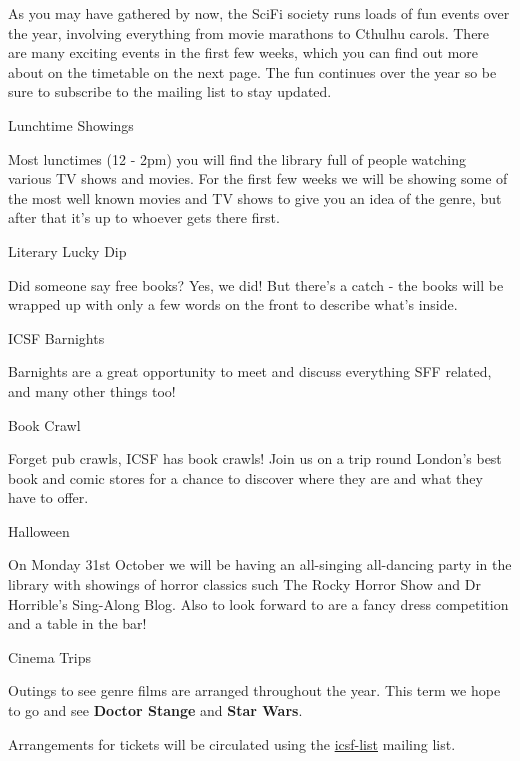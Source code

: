 \vspace{1mm} 

As you may have gathered by now, the SciFi society runs loads of fun events over the year, involving everything from movie marathons to Cthulhu carols. There are many exciting events in the first few weeks, which you can find out more about on the timetable on the next page. The fun continues over the year so be sure to subscribe to the mailing list to stay updated. 

\vspace{1mm} {\Large Lunchtime Showings}

Most lunctimes (12 - 2pm) you will find the library full of people watching various TV shows and movies. For the first few weeks we will be showing some of the most well known movies and TV shows to give you an idea of the genre, but after that it's up to whoever gets there first. 

\vspace{1mm} {\Large Literary Lucky Dip}

Did someone say free books? Yes, we did! But there's a catch - the books will be wrapped up with only a few words on the front to describe what's inside. 

\vspace{1mm} {\Large ICSF Barnights}

Barnights are a great opportunity to meet and discuss everything SFF related, and many other things too!

\vspace{1mm} {\Large Book Crawl}

Forget pub crawls, ICSF has book crawls! Join us on a trip round London's best book and comic stores for a chance to discover where they are and what they have to offer.

\vspace{1mm} {\Large Halloween}

On Monday 31st October we will be having an all-singing all-dancing party in the library with showings of horror classics such The Rocky Horror Show and Dr Horrible's Sing-Along Blog. Also to look forward to are a fancy dress competition and a table in the bar!

\vspace{1mm} {\Large Cinema Trips}

Outings to see genre films are arranged throughout the year. This term we hope to go and see \textbf{Doctor Stange} and \textbf{Star Wars}.

Arrangements for tickets will be circulated using the \url{icsf-list} mailing list.
